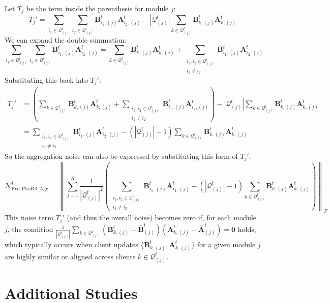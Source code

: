 \documentclass{article} %
\newcommand{\mat}[1]{\mathbf{#1}}
\begin{document}
Let $T_j^{\prime}$ be the term inside the parenthesis for module $j$:
$$T_j' = \sum_{i_1 \in \mathcal{Q}_{(j)}^t} \sum_{i_2 \in \mathcal{Q}_{(j)}^t} \mat{B}_{i_1,(j)}^t \mat{A}_{i_2,(j)}^t - |\mathcal{Q}_{(j)}^t| \sum_{k \in \mathcal{Q}_{(j)}^t} \mat{B}_{k,(j)}^t \mat{A}_{k,(j)}^t$$
We can expand the double summation:
$$\sum_{i_1 \in \mathcal{Q}_{(j)}^t} \sum_{i_2 \in \mathcal{Q}_{(j)}^t} \mat{B}_{i_1,(j)}^t \mat{A}_{i_2,(j)}^t = \sum_{k \in \mathcal{Q}_{(j)}^t} \mat{B}_{k,(j)}^t \mat{A}_{k,(j)}^t + \sum_{\substack{i_1, i_2 \in \mathcal{Q}_{(j)}^t \\ i_1 \neq i_2}} \mat{B}_{i_1,(j)}^t \mat{A}_{i_2,(j)}^t$$
Substituting this back into $T_j'$:
\begin{align*}
T_j' &= \left( \sum_{k \in \mathcal{Q}_{(j)}^t} \mat{B}_{k,(j)}^t \mat{A}_{k,(j)}^t + \sum_{\substack{i_1, i_2 \in \mathcal{Q}_{(j)}^t \\ i_1 \neq i_2}} \mat{B}_{i_1,(j)}^t \mat{A}_{i_2,(j)}^t \right) - |\mathcal{Q}_{(j)}^t| \sum_{k \in \mathcal{Q}_{(j)}^t} \mat{B}_{k,(j)}^t \mat{A}_{k,(j)}^t \\
&= \sum_{\substack{i_1, i_2 \in \mathcal{Q}_{(j)}^t \\ i_1 \neq i_2}} \mat{B}_{i_1,(j)}^t \mat{A}_{i_2,(j)}^t - \left( |\mathcal{Q}_{(j)}^t| - 1 \right) \sum_{k \in \mathcal{Q}_{(j)}^t} \mat{B}_{k,(j)}^t \mat{A}_{k,(j)}^t
\end{align*}
So the aggregation noise can also be expressed by substituting this form of $T_j'$:
$$\mathcal{N}_{\text{Fed-PLoRA\_Agg}}^{t} = \left\| \sum_{j=1}^R \frac{1}{|\mathcal{Q}_{(j)}^t|^2} \left( \sum_{\substack{i_1, i_2 \in \mathcal{Q}_{(j)}^t \\ i_1 \neq i_2}} \mat{B}_{i_1,(j)}^t \mat{A}_{i_2,(j)}^t - \left( |\mathcal{Q}_{(j)}^t| - 1 \right) \sum_{k \in \mathcal{Q}_{(j)}^t} \mat{B}_{k,(j)}^t \mat{A}_{k,(j)}^t \right) \right\|_F$$
This noise term $T_j'$ (and thus the overall noise) becomes zero if, for each module $j$, the condition $\frac{1}{|\mathcal{Q}_{(j)}^t|} \sum_{k \in \mathcal{Q}_{(j)}^t} (\mat{B}_{k,(j)}^t - \overline{\mat{B}}_{(j)}^t)(\mat{A}_{k,(j)}^t - \overline{\mat{A}}_{(j)}^t) = \mat{0}$ holds, which typically occurs when client updates $\{\mat{B}_{k,(j)}^t, \mat{A}_{k,(j)}^t\}$ for a given module $j$ are highly similar or aligned across clients $k \in \mathcal{Q}_{(j)}^t$.






\section{Additional Studies}\label{appendixsection:additionalstudies}
\end{document}
